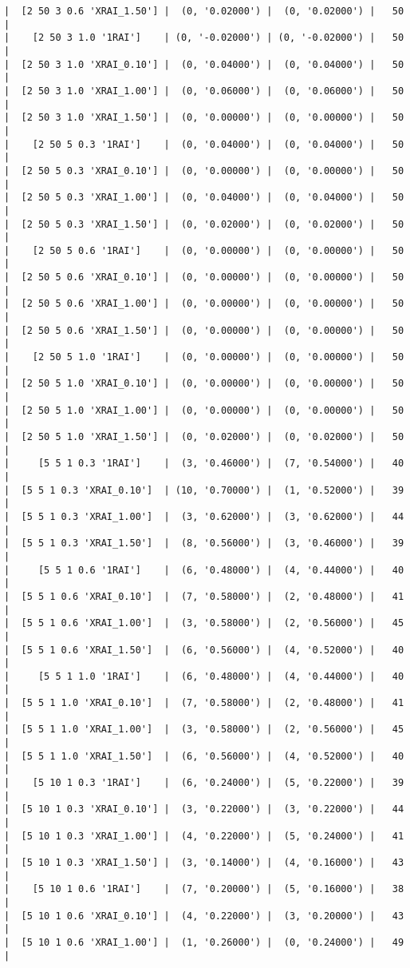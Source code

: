 \documentclass{article}
\begin{document}
\begin{verbatim}
|  [2 50 3 0.6 'XRAI_1.50'] |  (0, '0.02000') |  (0, '0.02000') |   50  |
|    [2 50 3 1.0 '1RAI']    | (0, '-0.02000') | (0, '-0.02000') |   50  |
|  [2 50 3 1.0 'XRAI_0.10'] |  (0, '0.04000') |  (0, '0.04000') |   50  |
|  [2 50 3 1.0 'XRAI_1.00'] |  (0, '0.06000') |  (0, '0.06000') |   50  |
|  [2 50 3 1.0 'XRAI_1.50'] |  (0, '0.00000') |  (0, '0.00000') |   50  |
|    [2 50 5 0.3 '1RAI']    |  (0, '0.04000') |  (0, '0.04000') |   50  |
|  [2 50 5 0.3 'XRAI_0.10'] |  (0, '0.00000') |  (0, '0.00000') |   50  |
|  [2 50 5 0.3 'XRAI_1.00'] |  (0, '0.04000') |  (0, '0.04000') |   50  |
|  [2 50 5 0.3 'XRAI_1.50'] |  (0, '0.02000') |  (0, '0.02000') |   50  |
|    [2 50 5 0.6 '1RAI']    |  (0, '0.00000') |  (0, '0.00000') |   50  |
|  [2 50 5 0.6 'XRAI_0.10'] |  (0, '0.00000') |  (0, '0.00000') |   50  |
|  [2 50 5 0.6 'XRAI_1.00'] |  (0, '0.00000') |  (0, '0.00000') |   50  |
|  [2 50 5 0.6 'XRAI_1.50'] |  (0, '0.00000') |  (0, '0.00000') |   50  |
|    [2 50 5 1.0 '1RAI']    |  (0, '0.00000') |  (0, '0.00000') |   50  |
|  [2 50 5 1.0 'XRAI_0.10'] |  (0, '0.00000') |  (0, '0.00000') |   50  |
|  [2 50 5 1.0 'XRAI_1.00'] |  (0, '0.00000') |  (0, '0.00000') |   50  |
|  [2 50 5 1.0 'XRAI_1.50'] |  (0, '0.02000') |  (0, '0.02000') |   50  |
|     [5 5 1 0.3 '1RAI']    |  (3, '0.46000') |  (7, '0.54000') |   40  |
|  [5 5 1 0.3 'XRAI_0.10']  | (10, '0.70000') |  (1, '0.52000') |   39  |
|  [5 5 1 0.3 'XRAI_1.00']  |  (3, '0.62000') |  (3, '0.62000') |   44  |
|  [5 5 1 0.3 'XRAI_1.50']  |  (8, '0.56000') |  (3, '0.46000') |   39  |
|     [5 5 1 0.6 '1RAI']    |  (6, '0.48000') |  (4, '0.44000') |   40  |
|  [5 5 1 0.6 'XRAI_0.10']  |  (7, '0.58000') |  (2, '0.48000') |   41  |
|  [5 5 1 0.6 'XRAI_1.00']  |  (3, '0.58000') |  (2, '0.56000') |   45  |
|  [5 5 1 0.6 'XRAI_1.50']  |  (6, '0.56000') |  (4, '0.52000') |   40  |
|     [5 5 1 1.0 '1RAI']    |  (6, '0.48000') |  (4, '0.44000') |   40  |
|  [5 5 1 1.0 'XRAI_0.10']  |  (7, '0.58000') |  (2, '0.48000') |   41  |
|  [5 5 1 1.0 'XRAI_1.00']  |  (3, '0.58000') |  (2, '0.56000') |   45  |
|  [5 5 1 1.0 'XRAI_1.50']  |  (6, '0.56000') |  (4, '0.52000') |   40  |
|    [5 10 1 0.3 '1RAI']    |  (6, '0.24000') |  (5, '0.22000') |   39  |
|  [5 10 1 0.3 'XRAI_0.10'] |  (3, '0.22000') |  (3, '0.22000') |   44  |
|  [5 10 1 0.3 'XRAI_1.00'] |  (4, '0.22000') |  (5, '0.24000') |   41  |
|  [5 10 1 0.3 'XRAI_1.50'] |  (3, '0.14000') |  (4, '0.16000') |   43  |
|    [5 10 1 0.6 '1RAI']    |  (7, '0.20000') |  (5, '0.16000') |   38  |
|  [5 10 1 0.6 'XRAI_0.10'] |  (4, '0.22000') |  (3, '0.20000') |   43  |
|  [5 10 1 0.6 'XRAI_1.00'] |  (1, '0.26000') |  (0, '0.24000') |   49  |

\end{verbatim}
\end{document}
